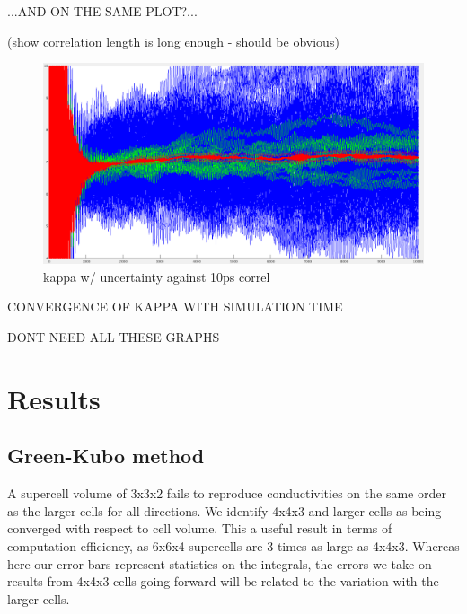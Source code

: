 \documentclass[%
preprint,                                  %
nofootinbib,
 amsmath,amssymb,
 aps,
]{revtex4-1}
\begin{document}
...AND ON THE SAME PLOT?...

(show correlation length is long enough - should be obvious)

\begin{figure}[h!]
  \includegraphics[width=\linewidth]{images/6x6x4_01-z-stddev_2-10ps.png}
  \caption{kappa w/ uncertainty against 10ps correl}
  \label{fig:664z_10ps}
\end{figure}


CONVERGENCE OF KAPPA WITH SIMULATION TIME


DONT NEED ALL THESE GRAPHS















\section{\label{sec:results}Results}

\subsection{\label{sec:results.gk}Green-Kubo method}

A supercell volume of 3x3x2 fails to reproduce conductivities on the same order as the larger cells for all directions. We identify 4x4x3 and larger cells as being converged with respect to cell volume. This a useful result in terms of computation efficiency, as 6x6x4 supercells are 3 times as large as 4x4x3. Whereas here our error bars represent statistics on the integrals, the errors we take on results from 4x4x3 cells going forward will be related to the variation with the larger cells.
\end{document}

